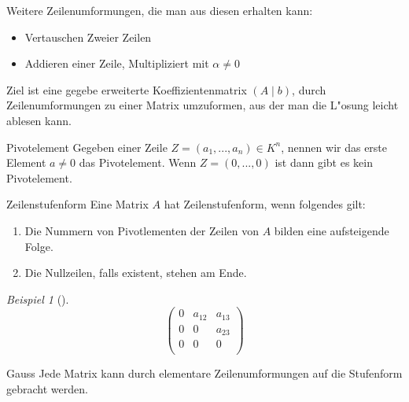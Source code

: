 \documentclass[11pt]{article}
\theoremstyle{remark}
\newtheorem{exa}{Beispiel}[section]
\theoremstyle{definition}
\theoremstyle{remark}
\begin{document}
Weitere Zeilenumformungen, die man aus diesen erhalten kann:
\begin{relation}
\begin{itemize}
\item Vertauschen Zweier Zeilen
\item Addieren einer Zeile, Multipliziert mit \(\alpha \not= 0\)
\end{itemize}
\end{relation}

Ziel ist eine gegebe erweiterte Koeffizientenmatrix \((A\mid b)\), durch
Zeilenumformungen zu einer Matrix umzuformen, aus der man die L"osung leicht
ablesen kann.

\begin{definition}{Pivotelement}{}
Gegeben einer Zeile \(Z=(a_1,...,a_n)\in K^n\), nennen wir das erste Element
\(a\not= 0\) das Pivotelement.
Wenn \(Z=(0,...,0)\) ist dann gibt es kein Pivotelement.
\end{definition}

\begin{definition}{Zeilenstufenform}{}
Eine Matrix \(A\) hat Zeilenstufenform, wenn folgendes gilt:
\begin{enumerate}
\item Die Nummern von Pivotlementen der Zeilen von \(A\) bilden eine aufsteigende
Folge.
\item Die Nullzeilen, falls existent, stehen am Ende.
\end{enumerate}
\end{definition}

\begin{exa}[] \label{} \
\[
\begin{pmatrix}
 0 & a_{12} & a_{13} \\
 0 & 0 & a_{23} \\
 0 & 0 & 0 \\
\end{pmatrix}
\]
\end{exa}

\begin{theo}{Gauss}{}
Jede Matrix kann durch elementare Zeilenumformungen auf die Stufenform gebracht
werden.
\end{theo}
\end{document}
